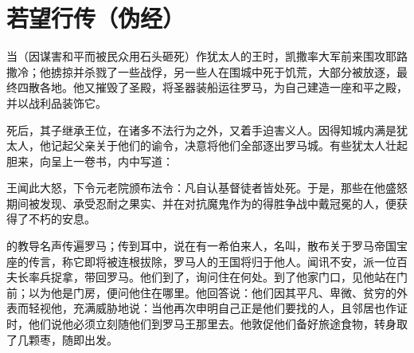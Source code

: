 
\chapter{若望行传（伪经）}


\par

当（因谋害和平而被民众用石头砸死）作犹太人的王时，凯撒率大军前来围攻耶路撒冷；他掳掠并杀戮了一些战俘，另一些人在围城中死于饥荒，大部分被放逐，最终四散各地。他又摧毁了圣殿，将圣器装船运往罗马，为自己建造一座和平之殿，并以战利品装饰它。\par

死后，其子继承王位，在诸多不法行为之外，又着手迫害义人。因得知城内满是犹太人，他记起父亲关于他们的谕令，决意将他们全部逐出罗马城。有些犹太人壮起胆来，向呈上一卷书，内中写道：\par

\par

王闻此大怒，下令元老院颁布法令：凡自认基督徒者皆处死。于是，那些在他盛怒期间被发现、承受忍耐之果实、并在对抗魔鬼作为的得胜争战中戴冠冕的人，便获得了不朽的安息。\par

的教导名声传遍罗马；传到耳中，说在有一希伯来人，名叫，散布关于罗马帝国宝座的传言，称它即将被连根拔除，罗马人的王国将归于他人。闻讯不安，派一位百夫长率兵捉拿，带回罗马。他们到了，询问住在何处。到了他家门口，见他站在门前；以为他是门房，便问他住在哪里。他回答说：他们因其平凡、卑微、贫穷的外表而轻视他，充满威胁地说：当他再次申明自己正是他们要找的人，且邻居也作证时，他们说他必须立刻随他们到罗马王那里去。他敦促他们备好旅途食物，转身取了几颗枣，随即出发。\par

